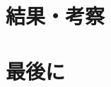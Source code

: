 \documentclass[11pt,a4paper]{jsarticle}
\theoremstyle{definition}
\begin{document}
\section{結果・考察}

\section{最後に}

\begin{comment} \begin{equation}
  \begin{split}
    a
  \end{split}
\end{equation}

\mathcal{L}(X,Y)
点列$(A_n)$
\\
&
\end{comment}


\end{document}
